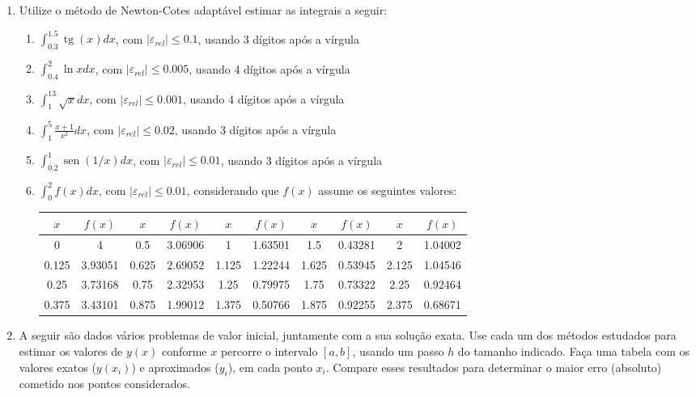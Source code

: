 \documentclass[12pt,a4paper]{article}
\newcommand*\sen{\operatorname{sen}}
\newcommand*\tg{\operatorname{tg}}
\begin{document}
\begin{enumerate}
\item Utilize o método de Newton-Cotes adaptável estimar as integrais a seguir:
\begin{enumerate}
\item $\int_{0.3}^{1.5} \tg(x) dx$, com $|\varepsilon_{rel}| \leq 0.1$, usando 3 dígitos após a vírgula
\item $\int_{0.4}^{2} \ln{x} dx$, com $|\varepsilon_{rel}| \leq 0.005$, usando 4 dígitos após a vírgula
\item $\int_{1}^{13} \sqrt{x} dx$, com $|\varepsilon_{rel}| \leq 0.001$, usando 4 dígitos após a vírgula
\item $\int_1^5 \frac{x+1}{x^2} dx$, com $|\varepsilon_{rel}| \leq 0.02$, usando 3 dígitos após a vírgula
\item $\int_{0.2}^{1} \sen(1/x) dx$, com $|\varepsilon_{rel}| \leq 0.01$, usando 3 dígitos após a vírgula
\item $\int_{0}^{2} f(x) dx$, com $|\varepsilon_{rel}| \leq 0.01$, considerando que $f(x)$ assume os seguintes valores:
\begin{center}\hspace{-1cm}
\begin{tabular}{|c|c||c|c||c|c||c|c||c|c|}
\hline
$x$ & $f(x)$ & $x$ & $f(x)$ & $x$ & $f(x)$ & $x$ & $f(x)$ & $x$ & $f(x)$\\
\hline
0 & 4 & 0.5 & 3.06906 & 1 & 1.63501 & 1.5 & 0.43281 & 2 & 1.04002\\
\hline
0.125 & 3.93051 & 0.625 & 2.69052 & 1.125 & 1.22244 & 1.625 & 0.53945 & 2.125 & 1.04546\\
\hline
0.25 & 3.73168 & 0.75 & 2.32953 & 1.25 & 0.79975 & 1.75 & 0.73322 & 2.25 & 0.92464\\
\hline
0.375 & 3.43101 & 0.875 & 1.99012 & 1.375 & 0.50766 & 1.875 & 0.92255 & 2.375 & 0.68671\\
\hline
\end{tabular}
\end{center}
\end{enumerate}
\item A seguir são dados vários problemas de valor inicial, juntamente com a sua solução exata. Use cada um dos métodos estudados para estimar os valores de $y(x)$ conforme $x$ percorre o intervalo $[a,b]$, usando um passo $h$ do tamanho indicado. Faça uma tabela com os valores exatos ($y(x_i)$) e aproximados ($y_i$), em cada ponto $x_i$. Compare esses resultados para determinar o maior erro (absoluto) cometido nos pontos considerados.
\begin{enumerate}

\end{enumerate}
\end{enumerate}
\end{document}
